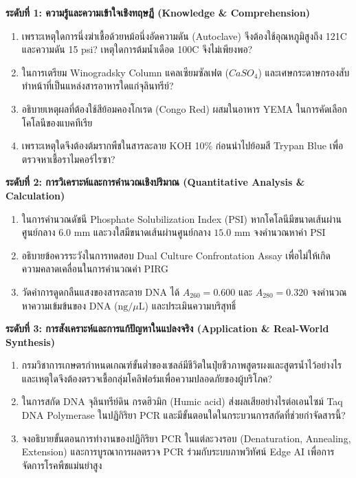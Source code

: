 \noindent \textbf{ระดับที่ 1: ความรู้และความเข้าใจเชิงทฤษฎี (Knowledge \& Comprehension)}
\begin{enumerate}
    \item เพราะเหตุใดการนึ่งฆ่าเชื้อด้วยหม้อนึ่งอัดความดัน (Autoclave) จึงต้องใช้อุณหภูมิสูงถึง 121\degree C และความดัน 15 psi? เหตุใดการต้มน้ำเดือด 100\degree C จึงไม่เพียงพอ?
    \item ในการเตรียม Winogradsky Column แคลเซียมซัลเฟต ($CaSO_4$) และเศษกระดาษกรองสับ ทำหน้าที่เป็นแหล่งสารอาหารใดแก่จุลินทรีย์?
    \item อธิบายเหตุผลที่ต้องใช้สีย้อมคองโกเรด (Congo Red) ผสมในอาหาร YEMA ในการคัดเลือกโคโลนีของแบคทีเรีย 
    \item เพราะเหตุใดจึงต้องต้มรากพืชในสารละลาย KOH 10\% ก่อนนำไปย้อมสี Trypan Blue เพื่อตรวจหาเชื้อราไมคอร์ไรซา?
\end{enumerate}

\noindent \textbf{ระดับที่ 2: การวิเคราะห์และการคำนวณเชิงปริมาณ (Quantitative Analysis \& Calculation)}
\begin{enumerate}[resume]
    \item ในการคำนวณดัชนี Phosphate Solubilization Index (PSI) หากโคโลนีมีขนาดเส้นผ่านศูนย์กลาง $6.0\text{ mm}$ และวงใสมีขนาดเส้นผ่านศูนย์กลาง $15.0\text{ mm}$ จงคำนวณหาค่า PSI
    \item อธิบายข้อควรระวังในการทดสอบ Dual Culture Confrontation Assay เพื่อไม่ให้เกิดความคลาดเคลื่อนในการคำนวณค่า PIRG
    \item วัดค่าการดูดกลืนแสงของสารละลาย DNA ได้ $A_{260} = 0.600$ และ $A_{280} = 0.320$ จงคำนวณหาความเข้มข้นของ DNA ($\text{ng/}\mu\text{L}$) และประเมินความบริสุทธิ์
\end{enumerate}

\noindent \textbf{ระดับที่ 3: การสังเคราะห์และการแก้ปัญหาในแปลงจริง (Application \& Real-World Synthesis)}
\begin{enumerate}[resume]
    \item กรมวิชาการเกษตรกำหนดเกณฑ์ขั้นต่ำของเซลล์มีชีวิตในปุ๋ยชีวภาพสูตรผงและสูตรน้ำไว้อย่างไร และเหตุใดจึงต้องตรวจเชื้อกลุ่มโคลิฟอร์มเพื่อความปลอดภัยของผู้บริโภค?
    \item ในการสกัด DNA จุลินทรีย์ดิน กรดฮิวมิก (Humic acid) ส่งผลเสียอย่างไรต่อเอนไซม์ Taq DNA Polymerase ในปฏิกิริยา PCR และมีขั้นตอนใดในกระบวนการสกัดที่ช่วยกำจัดสารนี้?
    \item จงอธิบายขั้นตอนการทำงานของปฏิกิริยา PCR ในแต่ละวงรอบ (Denaturation, Annealing, Extension) และการบูรณาการผลตรวจ PCR ร่วมกับระบบภาพวิทัศน์ Edge AI เพื่อการจัดการโรคพืชแม่นยำสูง
\end{enumerate}
